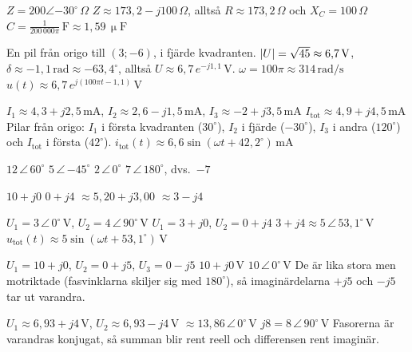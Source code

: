 
\begin{facit}

  $Z = 200\angle{-30^{\circ}}\,\Omega$
 $Z \approx 173{,}2 - j100\,\Omega$, alltså $R \approx 173{,}2\,\Omega$ och $X_C = 100\,\Omega$
 $C = \frac{1}{200\,000\pi}\,\text{F} \approx 1{,}59\,\upmu\text{F}$

  En pil från origo till $(3; -6)$, i fjärde kvadranten.
 $\lvert U\rvert = \sqrt{45} \approx 6{,}7\,\text{V}$, $\delta \approx -1{,}1\,\text{rad} \approx
-63{,}4^{\circ}$, alltså $U \approx 6{,}7\,e^{-j1{,}1}\,\text{V}$.
 $\omega = 100\pi \approx 314\,\text{rad/s}$
 $u(t) \approx 6{,}7\,e^{j(100\pi t - 1{,}1)}\,\text{V}$

  $I_1 \approx 4{,}3 + j2{,}5\,\text{mA}$, $I_2 \approx 2{,}6 - j1{,}5\,\text{mA}$,
$I_3 \approx -2 + j3{,}5\,\text{mA}$
 $I_{\text{tot}} \approx 4{,}9 + j4{,}5\,\text{mA}$
 Pilar från origo: $I_1$ i första kvadranten ($30^{\circ}$), $I_2$ i fjärde
($-30^{\circ}$), $I_3$ i andra ($120^{\circ}$) och $I_{\text{tot}}$ i första ($42^{\circ}$).
 $i_{\text{tot}}(t) \approx 6{,}6\sin(\omega t + 42{,}2^{\circ})\,\text{mA}$

  $12\,\angle\,60^{\circ}$  $5\,\angle\,{-45^{\circ}}$
 $2\,\angle\,0^{\circ}$  $7\,\angle\,180^{\circ}$, dvs.\ $-7$

  $10 + j0$  $0 + j4$  $\approx 5{,}20 + j3{,}00$
 $\approx 3 - j4$

  $U_1 = 3\,\angle\,0^{\circ}\,\text{V}$, $U_2 = 4\,\angle\,90^{\circ}\,\text{V}$
 $U_1 = 3 + j0$, $U_2 = 0 + j4$
 $3 + j4 \approx 5\,\angle\,53{,}1^{\circ}\,\text{V}$
 $u_{\text{tot}}(t) \approx 5\sin(\omega t + 53{,}1^{\circ})\,\text{V}$

  $U_1 = 10 + j0$, $U_2 = 0 + j5$, $U_3 = 0 - j5$  $10 + j0\,\text{V}$
 $10\,\angle\,0^{\circ}\,\text{V}$
 De är lika stora men motriktade (fasvinklarna skiljer sig med $180^{\circ}$), så
imaginärdelarna $+j5$ och $-j5$ tar ut varandra.

  $U_1 \approx 6{,}93 + j4\,\text{V}$, $U_2 \approx 6{,}93 - j4\,\text{V}$
 $\approx 13{,}86\,\angle\,0^{\circ}\,\text{V}$  $j8 = 8\,\angle\,90^{\circ}\,\text{V}$
 Fasorerna är varandras konjugat, så summan blir rent reell och differensen rent imaginär.


\end{facit}
